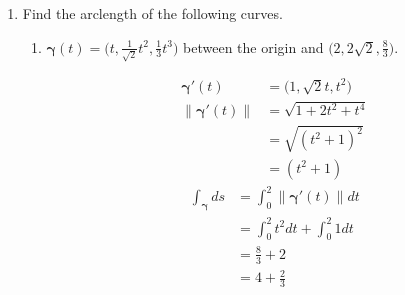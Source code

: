 \documentclass{article}
\newcommand{\norm}[1]{\| #1 \|}
\begin{document}
\begin{enumerate}
\newpage
\item Find the arclength of the following curves.
\begin{enumerate}
    \item $\displaystyle \boldsymbol{\gamma}(t) = \Bigg(t,\frac{1}{\sqrt{2}}t^2,\frac{1}{3}t^3 \Bigg)$ between the origin and $\displaystyle \Bigg(2,2\sqrt{2},\frac{8}{3}\Bigg)$.
    \begin{multicols}{2} 
    \noindent
    \begin{align*} 
        \boldsymbol{\gamma}'(t) &= \Big(1, \sqrt{2}t, t^2 \Big) \\
        \norm{\boldsymbol{\gamma}'(t)} &= \sqrt{1 + 2t^2 + t^4 } \\
        &= \sqrt{(t^2 + 1)^2 } \\ 
        &= (t^2 + 1) \
    \end{align*}
    \begin{align*}
        \int_{\boldsymbol{\gamma}} ds &= \int_0^2 \norm{\boldsymbol{\gamma}'(t)} dt \\
        &= \int_0^2 t^2 dt + \int_0^2 1 dt \\
        &= \frac{8}{3} + 2 \\
        &= 4 + \frac{2}{3}
    \end{align*}


\end{multicols}
\end{enumerate}
\end{enumerate}
\end{document}
